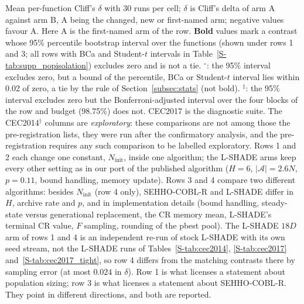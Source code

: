 \begin{table}[htbp]
\begin{tabular}{@{}>{\raggedright\arraybackslash}p{5.4cm}cccc@{}}
\bottomrule
\end{tabular}
\begin{flushleft}\footnotesize
Mean per-function Cliff's $\delta$ with 30 runs per cell; $\delta$ is Cliff's delta of arm A against arm B, A being the changed, new or first-named arm; negative values favour A. Here A is the first-named arm of the row. \textbf{Bold} values mark a contrast whose 95\% percentile bootstrap interval over the functions (shown under rows 1 and 3; all rows with BCa and Student-$t$ intervals in Table~\ref{S-tab:supp_popisolation}) excludes zero and is not a tie. $^{\circ}$: the 95\% interval excludes zero, but a bound of the percentile, BCa or Student-$t$ interval lies within 0.02 of zero, a tie by the rule of Section~\ref{subsec:stats} (not bold). $^{\ddagger}$: the 95\% interval excludes zero but the Bonferroni-adjusted interval over the four blocks of the row and budget (98.75\%) does not. CEC2017 is the diagnostic suite. The CEC2014$^{\dagger}$ columns are \emph{exploratory}: these comparisons are not among those the pre-registration lists, they were run after the confirmatory analysis, and the pre-registration requires any such comparison to be labelled exploratory. Rows 1 and 2 each change one constant, $N_{\text{init}}$, inside one algorithm; the L-SHADE arms keep every other setting as in our port of the published algorithm ($H=6$, $|\mathcal{A}|=2.6N$, $p=0.11$, bound handling, memory update). Rows 3 and 4 compare two different algorithms: besides $N_{\text{init}}$ (row 4 only), SEHHO-COBL-R and L-SHADE differ in $H$, archive rate and $p$, and in implementation details (bound handling, steady-state versus generational replacement, the CR memory mean, L-SHADE's terminal CR value, $F$ sampling, rounding of the pbest pool). The L-SHADE $18D$ arm of rows 1 and 4 is an independent re-run of stock L-SHADE with its own seed stream, not the L-SHADE runs of Tables~\ref{S-tab:cec2014}, \ref{S-tab:cec2017} and~\ref{S-tab:cec2017_tight}, so row 4 differs from the matching contrasts there by sampling error (at most $0.024$ in $\delta$). Row 1 is what licenses a statement about population sizing; row 3 is what licenses a statement about SEHHO-COBL-R. They point in different directions, and both are reported.
\end{flushleft}
\end{table}
